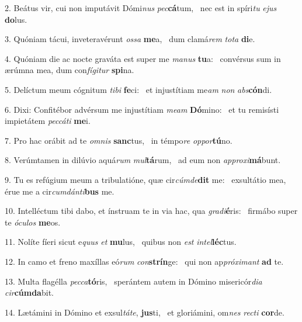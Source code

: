 2. Beátus vir, cui non imputávit Dómi\textit{nus} \textit{pec}\textbf{cá}tum, \ast\  nec est in spíri\textit{tu} \textit{e}\textit{jus} \textbf{do}lus.\

3. Quóniam tácui, inveteravérunt \textit{os}\textit{sa} \textbf{me}a, \ast\  dum clamá\textit{rem} \textit{to}\textit{ta} \textbf{di}e.\

4. Quóniam die ac nocte graváta est super me \textit{ma}\textit{nus} \textbf{tu}a: \ast\  convérsus sum in ærúmna mea, dum con\textit{fí}\textit{gi}\textit{tur} \textbf{spi}na.\

5. Delíctum meum cógnitum \textit{ti}\textit{bi} \textbf{fe}ci: \ast\  et injustítiam me\textit{am} \textit{non} \textit{abs}\textbf{cón}di.\

6. Dixi: Confitébor advérsum me injustítiam \textit{me}\textit{am} \textbf{Dó}mino: \ast\  et tu remisísti impietátem \textit{pec}\textit{cá}\textit{ti} \textbf{me}i.\

7. Pro hac orábit ad te \textit{om}\textit{nis} \textbf{sanc}tus, \ast\  in témpo\textit{re} \textit{op}\textit{por}\textbf{tú}no.\

8. Verúmtamen in dilúvio aquá\textit{rum} \textit{mul}\textbf{tá}rum, \ast\  ad eum non \textit{ap}\textit{pro}\textit{xi}\textbf{má}bunt.\

9. Tu es refúgium meum a tribulatióne, quæ cir\textit{cúm}\textit{de}\textbf{dit} me: \ast\  exsultátio mea, érue me a cir\textit{cum}\textit{dán}\textit{ti}\textbf{bus} me.\

10. Intelléctum tibi dabo, et ínstruam te in via hac, qua \textit{gra}\textit{di}\textbf{é}ris: \ast\  firmábo super te \textit{ó}\textit{cu}\textit{los} \textbf{me}os.\

11. Nolíte fíeri sicut e\textit{quus} \textit{et} \textbf{mu}lus, \ast\  quibus non \textit{est} \textit{in}\textit{tel}\textbf{léc}tus.\

12. In camo et freno maxíllas eó\textit{rum} \textit{con}\textbf{strín}ge: \ast\  qui non ap\textit{pró}\textit{xi}\textit{mant} \textbf{ad} te.\

13. Multa flagélla \textit{pec}\textit{ca}\textbf{tó}ris, \ast\  sperántem autem in Dómino misericór\textit{di}\textit{a} \textit{cir}\textbf{cúm}\textbf{da}bit.\

14. Lætámini in Dómino et exsul\textit{tá}\textit{te}, \textbf{jus}ti, \ast\  et gloriámini, om\textit{nes} \textit{rec}\textit{ti} \textbf{cor}de.\

